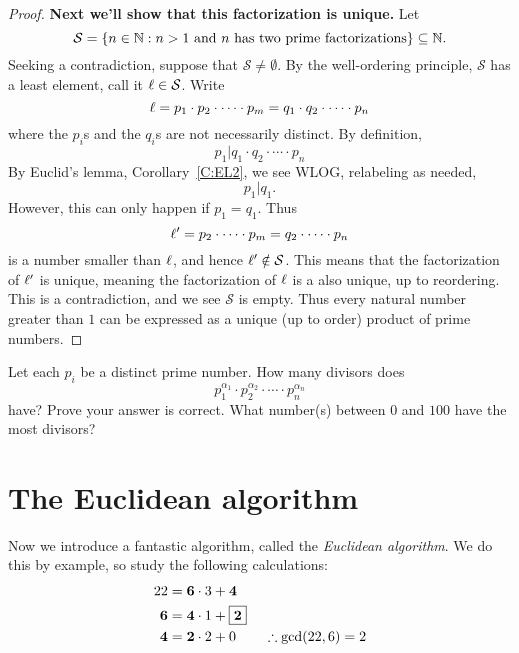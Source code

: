 \documentclass{ximera}
\begin{document}
\begin{corollary}
\begin{proof}
      \textbf{Next we'll show that this factorization is unique.}
      Let 
      \[
      \mathcal{S} = \{n\in\mathbb N: \text{$n>1$ and $n$ has two prime
        factorizations}\}\subseteq \mathbb N.
       \]
      Seeking a contradiction, suppose that $\mathcal{S} \ne
      \emptyset$. By the well-ordering
      principle, $\mathcal{S}$ has a least element, call it $\ell\in
      \mathcal{S}$. Write
      \[
      \ell = p_1 \cdot p_2 \cdot \cdots \cdot p_m = q_1 \cdot q_2 \cdot \cdots \cdot p_n
      \]
      where the $p_i$s and the $q_i$s are not necessarily distinct.
      By definition,
      \[
      p_1 |   q_1 \cdot q_2 \cdot \cdots \cdot p_n
      \]
      By Euclid's lemma, Corollary~\ref{C:EL2}, we see WLOG,
      relabeling as needed,
      \[
      p_1 | q_1.
      \]
      However, this can only happen if $p_1 = q_1$. Thus
      \[
      \ell' = p_2 \cdot \cdots \cdot p_m = q_2 \cdot \cdots \cdot p_n
      \]
      is a number smaller than $\ell$, and hence
      $\ell'\notin\mathcal{S}$. This means that the factorization of
      $\ell'$ is unique, meaning the factorization of $\ell$ is a also
      unique, up to reordering. This is a contradiction, and we see
      $\mathcal{S}$ is empty. Thus every natural number greater than
      $1$ can be expressed as a unique (up to order) product of prime
      numbers.
  \end{proof}
\end{corollary}


\begin{exercise}
  Let each $p_i$ be a distinct prime number.  How many divisors does
  \[
  p_1^{\alpha_1} \cdot p_2^{\alpha_2} \cdot \cdots \cdot p_n^{\alpha_n}
  \]
  have? Prove your answer is correct. What number(s) between $0$ and
  $100$ have the most divisors?
\end{exercise}





\section{The Euclidean algorithm}

Now we introduce a fantastic algorithm, called the \textit{Euclidean
  algorithm}. We do this by example, so study the following
calculations:
\begin{align*}
  22 &= \boldsymbol{6}\cdot 3 + \boldsymbol{4}\\
  \boldsymbol{6} &= \boldsymbol{4} \cdot 1 + \fbox{$\boldsymbol{2}$}\\
  \boldsymbol{4} &= \boldsymbol{2} \cdot 2 + 0 \qquad
\therefore \gcd(22,6) = 2
\end{align*}
\end{document}
